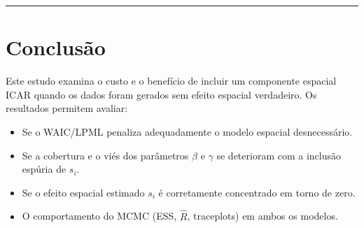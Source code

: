 \documentclass[
]{article}
\providecommand{\tightlist}{%
  \setlength{\itemsep}{0pt}\setlength{\parskip}{0pt}}
\begin{document}
\begin{center}\rule{0.5\linewidth}{0.5pt}\end{center}

\section{Conclusão}\label{conclusuxe3o}

Este estudo examina o custo e o benefício de incluir um componente
espacial ICAR quando os dados foram gerados sem efeito espacial
verdadeiro. Os resultados permitem avaliar:

\begin{itemize}
\tightlist
\item
  Se o WAIC/LPML penaliza adequadamente o modelo espacial desnecessário.
\item
  Se a cobertura e o viés dos parâmetros \(\beta\) e \(\gamma\) se
  deterioram com a inclusão espúria de \(s_i\).
\item
  Se o efeito espacial estimado \(s_i\) é corretamente concentrado em
  torno de zero.
\item
  O comportamento do MCMC (ESS, \(\hat{R}\), traceplots) em ambos os
  modelos.
\end{itemize}
\end{document}
